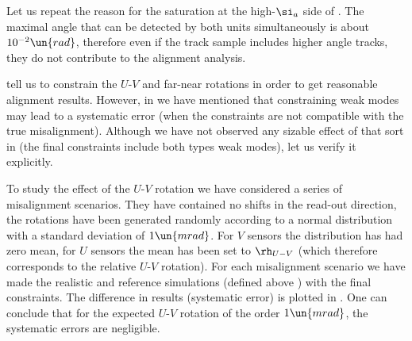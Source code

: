 Let us repeat the reason for the saturation at the high-$\si_a$ side of . The maximal angle that can be detected by both units simultaneously is about $10^{-2}\un{rad}$, therefore even if the track sample includes higher angle tracks, they do not contribute to the alignment analysis.


 tell us to constrain the $U$-$V$ and far-near rotations in order to get reasonable alignment results. However, in  we have mentioned that constraining weak modes may lead to a systematic error (when the constraints are not compatible with the true misalignment). Although we have not observed any sizable effect of that sort in  (the final constraints include both types weak modes), let us verify it explicitly.

To study the effect of the $U$-$V$ rotation we have considered a series of misalignment scenarios. They have contained no shifts in the read-out direction, the rotations have been generated randomly according to a normal distribution with a standard deviation of $1\un{mrad}$. For $V$ sensors the distribution has had zero mean, for $U$ sensors the mean has been set to $\rh_{U-V}$ (which therefore corresponds to the relative $U$-$V$ rotation). For each misalignment scenario we have made the realistic and reference simulations (defined above ) with the final constraints. The difference in results (systematic error) is plotted in . One can conclude that for the expected $U$-$V$ rotation of the order $1\un{mrad}$, the systematic errors are negligible.



